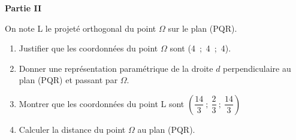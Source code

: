 \textbf{Partie II}

\medskip

On note L le projeté orthogonal du point $\Omega$ sur le plan (PQR).

\medskip

\begin{enumerate}
\item Justifier que les coordonnées du point $\Omega$ sont (4~;~4~;~4).
\item Donner une représentation paramétrique de la droite $d$ perpendiculaire au plan (PQR) et passant par $\Omega$.
\item Montrer que les coordonnées du point L sont $\left(\dfrac{14}{3}~;~ \dfrac{2}{3}~;~\dfrac{14}{3}\right)$
\item Calculer la distance du point $\Omega$ au plan (PQR).
\end{enumerate}


\bigskip
